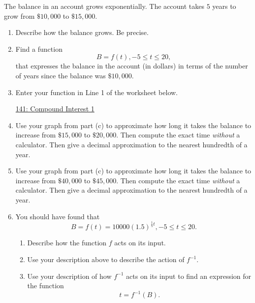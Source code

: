 \documentclass{ximera}
\begin{document}
\begin{question}  \label{Q:dfehy3190h5h}
The balance in an account grows exponentially. The account takes $5$ years to grow from $\$10,000$ to $\$15,000$. 

\begin{enumerate}
\item Describe how the balance grows. Be precise.

\item Find a function 
\[
B = f(t), -5\leq t \leq 20,
\]
that expresses the balance in the account (in dollars) in terms of the number of years since the balance was $\$10,000$.

\item Enter your function in Line 1 of the worksheet below. 

\begin{onlineOnly}
    \begin{center}
\end{center}
\end{onlineOnly}


\href{https://www.desmos.com/calculator/depmu5ngz0}{141: Compound Interest 1}

\item Use your graph from part (c) to approximate how long it takes the balance to increase from $\$15,000$ to $\$20,000$. Then compute the exact time \emph{without} a calculator. Then give a decimal approximation to the nearest hundredth of a year.

\item Use your graph from part (c) to approximate how long it takes the balance to increase from $\$40,000$ to $\$45,000$. Then compute the exact time \emph{without} a calculator. Then give a decimal approximation to the nearest hundredth of a year.

\item You should have found that
\[
    B = f(t) = 10000 (1.5)^{\frac{1}{5}t} , -5 \leq t \leq 20.
\]

\begin{enumerate}

\item Describe how the function $f$ acts on its input.

\item Use your description above to describe the action of $f^{-1}$.

\item Use your description of how $f^{-1}$ acts on its input to find an expression for the function 
\[ 
      t  = f^{-1}(B) .
\]


\end{enumerate}
\end{enumerate}
\end{question}
\end{document}
